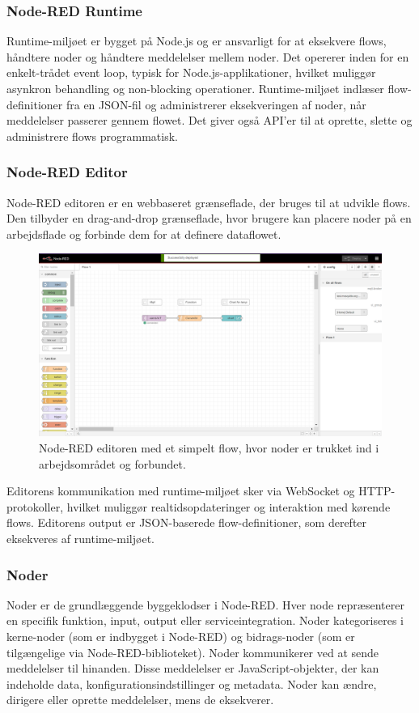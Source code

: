 \subsubsection{Node-RED Runtime}
Runtime-miljøet er bygget på Node.js og er ansvarligt for at eksekvere flows, håndtere noder og håndtere meddelelser mellem noder. Det opererer inden for en enkelt-trådet event loop, typisk for Node.js-applikationer, hvilket muliggør asynkron behandling og non-blocking operationer. Runtime-miljøet indlæser flow-definitioner fra en JSON-fil og administrerer eksekveringen af noder, når meddelelser passerer gennem flowet. Det giver også API'er til at oprette, slette og administrere flows programmatisk.

\subsubsection{Node-RED Editor}
Node-RED editoren er en webbaseret grænseflade, der bruges til at udvikle flows. Den tilbyder en drag-and-drop grænseflade, hvor brugere kan placere noder på en arbejdsflade og forbinde dem for at definere dataflowet.

\begin{figure}[h!]
	\centering
	\includegraphics[width=\textwidth]{fig/fig25.png} %
	\caption{Node-RED editoren med et simpelt flow, hvor noder er trukket ind i arbejdsområdet og forbundet.}
\end{figure}
\noindent Editorens kommunikation med runtime-miljøet sker via WebSocket og HTTP-protokoller, hvilket muliggør realtidsopdateringer og interaktion med kørende flows. Editorens output er JSON-baserede flow-definitioner, som derefter eksekveres af runtime-miljøet.

\subsubsection{Noder}
Noder er de grundlæggende byggeklodser i Node-RED. Hver node repræsenterer en specifik funktion, input, output eller serviceintegration. Noder kategoriseres i kerne-noder (som er indbygget i Node-RED) og bidrags-noder (som er tilgængelige via Node-RED-biblioteket). Noder kommunikerer ved at sende meddelelser til hinanden. Disse meddelelser er JavaScript-objekter, der kan indeholde data, konfigurationsindstillinger og metadata. Noder kan ændre, dirigere eller oprette meddelelser, mens de eksekverer.

